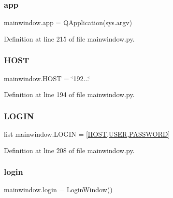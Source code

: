 \subsubsection{\texorpdfstring{app}{app}}
{\footnotesize\ttfamily mainwindow.\+app = Q\+Application(sys.\+argv)}



Definition at line 215 of file mainwindow.\+py.

\mbox{\label{namespacemainwindow_a84d2c2e5d196b2ba90c507d0cec59608}} 
\subsubsection{\texorpdfstring{HOST}{HOST}}
{\footnotesize\ttfamily mainwindow.\+H\+O\+ST = \char`\"{}192...\char`\"{}}



Definition at line 194 of file mainwindow.\+py.

\mbox{\label{namespacemainwindow_af4882c18203e8931620b97e2e834a008}} 
\subsubsection{\texorpdfstring{LOGIN}{LOGIN}}
{\footnotesize\ttfamily list mainwindow.\+L\+O\+G\+IN = \mbox{[}\mbox{\hyperlink{namespacemainwindow_a84d2c2e5d196b2ba90c507d0cec59608}{H\+O\+ST}},\mbox{\hyperlink{namespacemainwindow_a08ced40f6e9dec6e6baebf53dd6d2c6a}{U\+S\+ER}},\mbox{\hyperlink{namespacemainwindow_a9c35ad9c903521379a9dc1171bbe11b4}{P\+A\+S\+S\+W\+O\+RD}}\mbox{]}}



Definition at line 208 of file mainwindow.\+py.

\mbox{\label{namespacemainwindow_a1e38a99874e3df5d91680ea8faeba369}} 
\subsubsection{\texorpdfstring{login}{login}}
{\footnotesize\ttfamily mainwindow.\+login = Login\+Window()}



